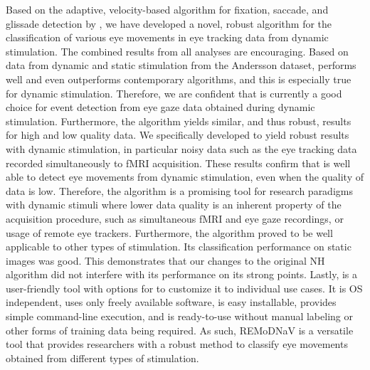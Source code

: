 Based on the adaptive, velocity-based algorithm for fixation, saccade, and
glissade detection by \cite{Nystrom2010AnData}, we have developed a novel,
robust algorithm for the classification of various eye movements in eye
tracking data from dynamic stimulation.  The combined results from all analyses
are encouraging. Based on data from dynamic and static stimulation from the
Andersson dataset, \remodnav performs well and even outperforms contemporary
algorithms, and this is especially true for dynamic stimulation. Therefore, we
are confident that \remodnav is currently a good choice for event detection
from eye gaze data obtained during dynamic stimulation.  Furthermore, the
algorithm yields similar, and thus robust, results for high and low quality
data. We specifically developed \remodnav to yield robust results with dynamic
stimulation, in particular noisy data such as the eye tracking data recorded
simultaneously to fMRI acquisition. These results confirm that \remodnav is
well able to detect eye movements from dynamic stimulation, even when the
quality of data is low. Therefore, the algorithm is a promising tool for
research paradigms with dynamic stimuli where lower data quality is an inherent
property of the acquisition procedure, such as simultaneous fMRI and eye gaze
recordings, or usage of remote eye trackers.  Furthermore, the algorithm proved
to be well applicable to other types of stimulation. Its classification
performance on static images was good. This demonstrates that our changes to
the original NH algorithm did not interfere with its performance on its strong
points. Lastly, \remodnav is a user-friendly tool with options for to customize
it to individual use cases. It is OS independent, uses only freely available
software, is easy installable, provides simple command-line execution, and is
ready-to-use without manual labeling or other forms of training data being
required. As such, REMoDNaV is a versatile tool that provides researchers with
a robust method to classify eye movements obtained from different types of
stimulation.

